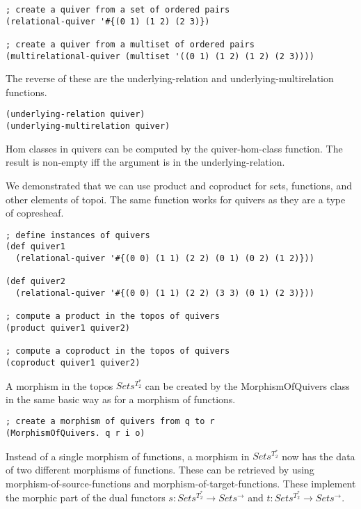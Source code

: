 \documentclass[a4paper,11pt]{report}
\begin{document}
\lstset {language=Lisp}
\begin{lstlisting}
; create a quiver from a set of ordered pairs
(relational-quiver '#{(0 1) (1 2) (2 3)})

; create a quiver from a multiset of ordered pairs
(multirelational-quiver (multiset '((0 1) (1 2) (1 2) (2 3))))
\end{lstlisting}

The reverse of these are the underlying-relation and underlying-multirelation functions.

\lstset {language=Lisp}
\begin{lstlisting}
(underlying-relation quiver)
(underlying-multirelation quiver)
\end{lstlisting}

Hom classes in quivers can be computed by the quiver-hom-class function. The result is non-empty iff the argument is in the underlying-relation. \newpage

\newpage 

We demonstrated that we can use product and coproduct for sets, functions, and other elements of topoi. The same function works for quivers as they are a type of copresheaf.

\lstset {language=Lisp}
\begin{lstlisting}
; define instances of quivers
(def quiver1 
  (relational-quiver '#{(0 0) (1 1) (2 2) (0 1) (0 2) (1 2)}))
  
(def quiver2
  (relational-quiver '#{(0 0) (1 1) (2 2) (3 3) (0 1) (2 3)}))
  
; compute a product in the topos of quivers
(product quiver1 quiver2)

; compute a coproduct in the topos of quivers
(coproduct quiver1 quiver2)
\end{lstlisting}

A morphism in the topos $Sets^{T_2^*}$ can be created by the MorphismOfQuivers class in the same basic way as for a morphism of functions.

\lstset {language=Lisp}
\begin{lstlisting}
; create a morphism of quivers from q to r
(MorphismOfQuivers. q r i o)
\end{lstlisting}

Instead of a single morphism of functions, a morphism in $Sets^{T_2^*}$ now has the data of two different morphisms of functions. These can be retrieved by using morphism-of-source-functions and morphism-of-target-functions. These implement the morphic part of the dual functors $s : Sets^{T_2^*} \to Sets^{\to}$ and $t : Sets^{T_2^*} \to Sets^{\to}$. \\
\end{document}
